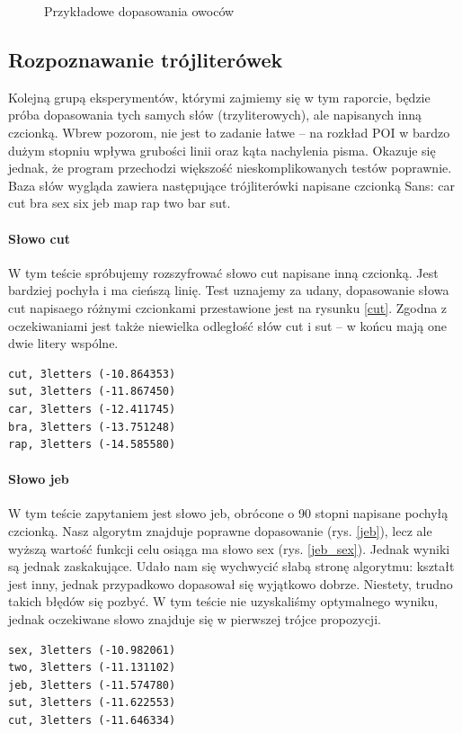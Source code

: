 \documentclass[a4paper,12pt,leqno]{article}
\begin{document}
\begin{figure}
\caption{Przykładowe dopasowania owoców}\label{matches}
\end{figure}

\subsection{Rozpoznawanie trójliterówek}

Kolejną grupą eksperymentów, którymi zajmiemy się w tym raporcie, będzie próba dopasowania tych samych słów (trzyliterowych), ale napisanych inną czcionką.
Wbrew pozorom, nie jest to zadanie łatwe -- na rozkład POI w bardzo dużym stopniu wpływa grubości linii oraz kąta nachylenia pisma. Okazuje się jednak, że
program przechodzi większość nieskomplikowanych testów poprawnie. Baza słów wygląda zawiera następujące trójliterówki napisane czcionką Sans:
car cut bra sex six jeb map rap two bar sut.

\paragraph{Słowo cut}
W tym teście spróbujemy rozszyfrować słowo cut napisane inną czcionką. Jest bardziej pochyła i ma cieńszą linię. Test uznajemy za udany, dopasowanie słowa
cut napisaego różnymi czcionkami przestawione jest na rysunku \ref{cut}. Zgodna z oczekiwaniami jest także niewielka odległość słów cut i sut -- w końcu
mają one dwie litery wspólne.
\begin{verbatim}
cut, 3letters (-10.864353)
sut, 3letters (-11.867450)
car, 3letters (-12.411745)
bra, 3letters (-13.751248)
rap, 3letters (-14.585580)
\end{verbatim}

\paragraph{Słowo jeb}
W tym teście zapytaniem jest słowo jeb, obrócone o 90 stopni napisane pochyłą czcionką. Nasz algorytm znajduje poprawne dopasowanie (rys. \ref{jeb}), lecz
ale wyższą wartość funkcji celu osiąga ma słowo sex (rys. \ref{jeb_sex}). Jednak wyniki są jednak zaskakujące. Udało nam się wychwycić słabą stronę algorytmu:
kształt jest inny, jednak przypadkowo dopasował się wyjątkowo dobrze. Niestety, trudno takich błędów się pozbyć. W tym teście nie uzyskaliśmy optymalnego
wyniku, jednak oczekiwane słowo znajduje się w pierwszej trójce propozycji.
\begin{verbatim}
sex, 3letters (-10.982061)
two, 3letters (-11.131102)
jeb, 3letters (-11.574780)
sut, 3letters (-11.622553)
cut, 3letters (-11.646334)
\end{verbatim}
\end{document}
